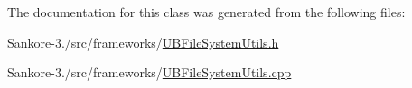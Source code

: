 The documentation for this class was generated from the following files\-:\begin{DoxyCompactItemize}
\item 
Sankore-\/3./src/frameworks/\hyperlink{_u_b_file_system_utils_8h}{U\-B\-File\-System\-Utils.\-h}\item 
Sankore-\/3./src/frameworks/\hyperlink{_u_b_file_system_utils_8cpp}{U\-B\-File\-System\-Utils.\-cpp}\end{DoxyCompactItemize}
